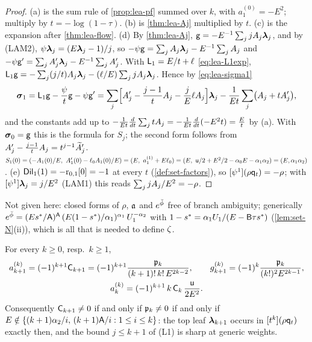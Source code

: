 \begin{proof}
(a) is the sum rule of \cref{prop:lea-pf} summed over $k$, with $a_1^{(0)} = -E^2$; multiply by $t = -\log(1-\tau)$. (b) is \cref{thm:lea-Aj} multiplied by $t$. (c) is the expansion after \cref{thm:lea-flow}. (d) By \cref{thm:lea-Aj}, $\mathsf{g} = -E^{-1}\sum_jjA_j\boldsymbol{\lambda}_j$, and by (LAM2), $\psi\boldsymbol{\lambda}_j = (E\boldsymbol{\lambda}_j-1)/j$, so $-\psi\mathsf{g} = \sum_jA_j\boldsymbol{\lambda}_j - E^{-1}\sum_jA_j$ and $-\psi\mathsf{g}' = \sum_jA_j'\boldsymbol{\lambda}_j - E^{-1}\sum_jA_j'$. With $\mathsf{L}_1 = E/t + \ell$ \eqref{eq:lea-L1exp}, $\mathsf{L}_1\mathsf{g} = -\sum_j(j/t)A_j\boldsymbol{\lambda}_j - (\ell/E)\sum_jjA_j\boldsymbol{\lambda}_j$. Hence by \eqref{eq:lea-sigma1}
\[
\boldsymbol{\sigma}_1 = \mathsf{L}_1\mathsf{g} - \frac{\psi}{t}\mathsf{g} - \psi\mathsf{g}' = \sum_j\Bigl[A_j' - \frac{j-1}{t}A_j - \frac{j}{E}\ell A_j\Bigr]\boldsymbol{\lambda}_j - \frac{1}{Et}\sum_j\bigl(A_j + tA_j'\bigr),
\]
and the constants add up to $-\frac{1}{Et}\frac{d}{dt}\sum_jtA_j = -\frac{1}{Et}\frac{d}{dt}(-E^2t) = \frac{E}{t}$ by (a). With $\boldsymbol{\sigma}_0 = \mathsf{g}$ this is the formula for $S_j$; the second form follows from $A_j' - \frac{j-1}{t}A_j = t^{j-1}\widetilde{A}_j'$. $S_1(0) = (-A_1(0)/E,\ A_1'(0) - \ell_0A_1(0)/E) = (E,\ a_1^{(1)} + E\ell_0) = (E,\ \mathsf{u}/2 + E^2/2 - \alpha_0E - \alpha_1\alpha_2) = (E,\alpha_1\alpha_2)$. (e) $\mathsf{Dil}_1(1) = -\mathrm{r}_{0,1}[0] = -1$ at every $t$ (\cref{def:set-factors}), so $[\psi^1](\rho\mathsf{q}_{t}) = -\rho$; with $[\psi^1]\boldsymbol{\lambda}_j = j/E^2$ (LAM1) this reads $\sum_jjA_j/E^2 = -\rho$.
\end{proof}

Not given here: closed forms of $\rho$, $\mathfrak{a}$ and $e^{\breve{\phi}}$ free of branch ambiguity; generically $e^{\breve{\phi}} = (Es^{\ast}/\mathsf{A})^{\mathsf{A}}\,(E(1-s^{\ast})/\alpha_1)^{\alpha_1}\,U_1^{-\alpha_2}$ with $1-s^{\ast} = \alpha_1U_1/(E-\mathsf{B}\tau s^{\ast})$ (\cref{lem:set-N}(ii)), which is all that is needed to define $\zeta$.

\begin{cor}
\label{cor:lea-top}
For every $k\geq 0$, resp.\ $k\geq 1$,
\[
\begin{gathered}
a_{k+1}^{(k)} = (-1)^{k+1}\mathsf{C}_{k+1} = (-1)^{k+1}\frac{\mathfrak{p}_k}{(k+1)!\,k!\,E^{2k-2}},\qquad
g_{k+1}^{(k)} = (-1)^k\frac{\mathfrak{p}_k}{(k!)^2E^{2k-1}},\\
a_k^{(k)} = (-1)^{k+1}\,k\,\mathsf{C}_k\,\frac{\mathsf{u}}{2E^2}.
\end{gathered}
\]
Consequently $\mathsf{C}_{k+1}\neq 0$ if and only if $\mathfrak{p}_k\neq 0$ if and only if $E\notin\{(k+1)\alpha_2/i,\,(k+1)\mathsf{A}/i : 1\leq i\leq k\}$: the top leaf $\boldsymbol{\lambda}_{k+1}$ occurs in $[t^k](\rho\mathsf{q}_{t})$ exactly then, and the bound $j\leq k+1$ of (L1) is sharp at generic weights.
\end{cor}

